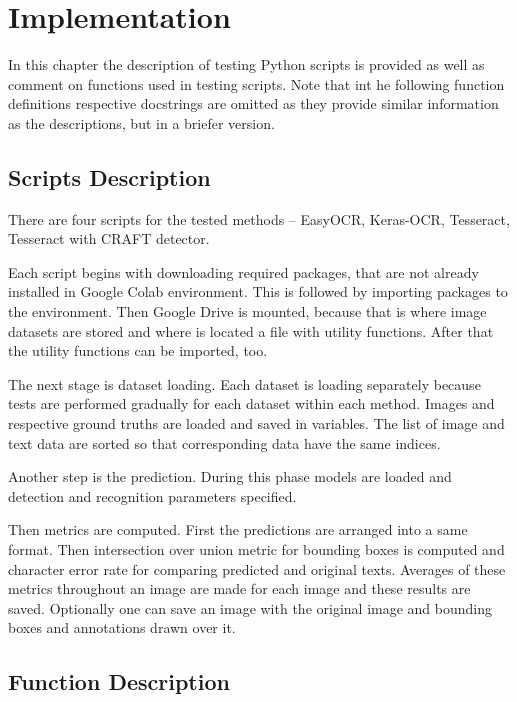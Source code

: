 \chapter{Implementation}

In this chapter the description of testing Python scripts is provided as well as comment on functions used in testing scripts. Note that int he following function definitions respective docstrings are omitted as they provide similar information as the descriptions, but in a 	briefer version.      

\section{Scripts Description}

There are four scripts for the tested methods -- EasyOCR, Keras-OCR, Tesseract, Tesseract with CRAFT detector. 

Each script begins with downloading required packages, that are not already installed in Google Colab environment. This is followed by importing packages to the environment. Then Google Drive is mounted, because that is where image datasets are stored and where is located a file with utility functions. After that the utility functions can be imported, too.

The next stage is dataset loading. Each dataset is loading separately because tests are performed gradually for each dataset within each method. Images and respective ground truths are loaded and saved in variables. The list of image and text data are sorted so that corresponding data have the same indices.

Another step is the prediction. During this phase models are loaded and detection and recognition parameters specified. 

Then metrics are computed. First the predictions are arranged into a same format. Then intersection over union metric for bounding boxes is computed and character error rate for comparing predicted and original texts. Averages of these metrics throughout an image are made for each image and these results are saved. Optionally one can save an image with the original image and bounding boxes and annotations drawn over it.

\section{Function Description}




